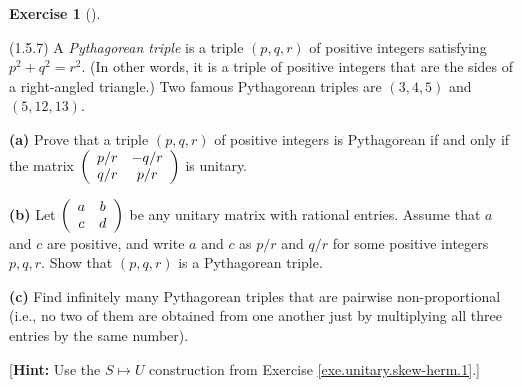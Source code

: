\documentclass[numbers=enddot,12pt,final,onecolumn,notitlepage]{scrartcl}
\newcounter{exer}
\theoremstyle{definition}
\newtheorem{exmp}[exer]{Exercise}
\newenvironment{exercise}[1][]
{\begin{exmp}[#1]\begin{leftbar}}
        {\end{leftbar}\end{exmp}}
\begin{document}
\begin{exercise}
	\label{exe.unitary.skew-herm.pyth} (1.5.7) A \emph{Pythagorean triple} is a
	triple $\left(  p,q,r\right)  $ of positive integers satisfying $p^{2}%
		+q^{2}=r^{2}$. (In other words, it is a triple of positive integers that are
	the sides of a right-angled triangle.) Two famous Pythagorean triples are
	$\left(  3,4,5\right)  $ and $\left(  5,12,13\right)  $. \medskip

	\textbf{(a)} Prove that a triple $\left(  p,q,r\right)  $ of positive integers
	is Pythagorean if and only if the matrix $\left(
		\begin{array}
				[c]{cc}%
				p/r & -q/r \\
				q/r & p/r
			\end{array}
		\right)  $ is unitary. \medskip

	\textbf{(b)} Let $\left(
		\begin{array}
				[c]{cc}%
				a & b \\
				c & d
			\end{array}
		\right)  $ be any unitary matrix with rational entries. Assume that $a$ and
	$c$ are positive, and write $a$ and $c$ as $p/r$ and $q/r$ for some positive
	integers $p,q,r$. Show that $\left(  p,q,r\right)  $ is a Pythagorean triple.
	\medskip

	\textbf{(c)} Find infinitely many Pythagorean triples that are pairwise
	non-proportional (i.e., no two of them are obtained from one another just by
	multiplying all three entries by the same number). \medskip

	[\textbf{Hint:} Use the $S\mapsto U$ construction from Exercise
		\ref{exe.unitary.skew-herm.1}.]
\end{exercise}
\end{document}
